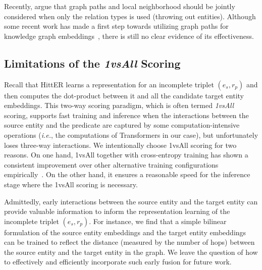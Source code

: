 \documentclass[11pt]{article}
\newcommand{\hit}{HittER\xspace}
\begin{document}
Recently, \citet{wang2020entity} argue that graph paths and local neighborhood should be jointly considered when only the relation types is used (throwing out entities).
Although some recent work has made a first step towards utilizing graph paths for knowledge graph embeddings~\cite{wang2019coke,wang2020dolores}, there is still no clear evidence of its effectiveness.


\subsection{Limitations of the \emph{1vsAll} Scoring}
Recall that \hit{} learns a representation for an incomplete triplet $(e_s, r_p)$ and then computes the dot-product between it and all the candidate target entity embeddings. This two-way scoring paradigm, which is often termed \textit{1vsAll} scoring, supports fast training and inference when the interactions between the source entity and the predicate are captured by some computation-intensive operations (\textit{i.e.}, the computations of Transformers in our case), but unfortunately loses three-way interactions.
We intentionally choose 1vsAll scoring for two reasons.
On one hand, 1vsAll together with cross-entropy training has shown a consistent improvement over other alternative training configurations empirically~\cite{Ruffinelli2020You}.
On the other hand, it ensures a reasonable speed for the inference stage where the 1vsAll scoring is necessary.

Admittedly, early interactions between the source entity and the target entity can provide valuable information to inform the representation learning of the incomplete triplet $(e_s, r_p)$.
For instance, we find that a simple bilinear formulation of the source entity embeddings and the target entity embeddings can be trained to reflect the distance (measured by the number of hops) between the source entity and the target entity in the graph.
We leave the question of how to effectively and efficiently incorporate such early fusion for future work.
%
 
\end{document}
